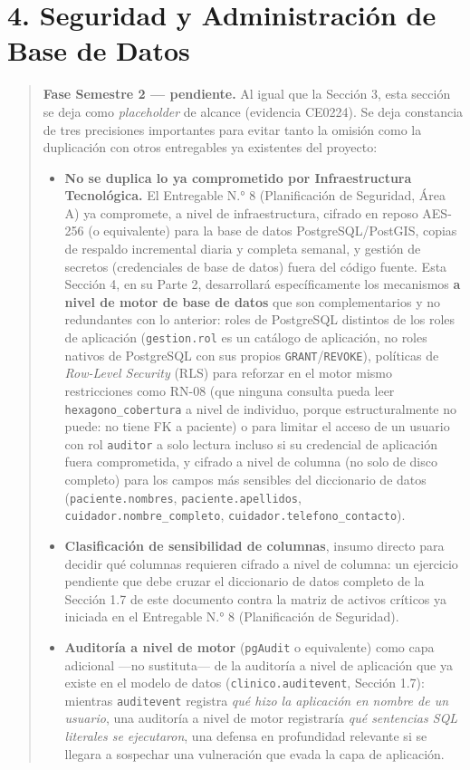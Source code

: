 \documentclass[11pt,a4paper]{article}
\providecommand{\tightlist}{%
  \setlength{\itemsep}{0pt}\setlength{\parskip}{0pt}}
\begin{document}
\section{4. Seguridad y Administración de Base de Datos}\label{seguridad-y-administraciuxf3n-de-base-de-datos}

\begin{quote}
\textbf{Fase Semestre 2 --- pendiente.} Al igual que la Sección 3, esta sección se deja como \emph{placeholder} de alcance (evidencia CE0224). Se deja constancia de tres precisiones importantes para evitar tanto la omisión como la duplicación con otros entregables ya existentes del proyecto:

\begin{itemize}
\tightlist
\item
  \textbf{No se duplica lo ya comprometido por Infraestructura Tecnológica.} El Entregable N.° 8 (Planificación de Seguridad, Área A) ya compromete, a nivel de infraestructura, cifrado en reposo AES-256 (o equivalente) para la base de datos PostgreSQL/PostGIS, copias de respaldo incremental diaria y completa semanal, y gestión de secretos (credenciales de base de datos) fuera del código fuente. Esta Sección 4, en su Parte 2, desarrollará específicamente los mecanismos \textbf{a nivel de motor de base de datos} que son complementarios y no redundantes con lo anterior: roles de PostgreSQL distintos de los roles de aplicación (\texttt{gestion.rol} es un catálogo de aplicación, no roles nativos de PostgreSQL con sus propios \texttt{GRANT}/\texttt{REVOKE}), políticas de \emph{Row-Level Security} (RLS) para reforzar en el motor mismo restricciones como RN-08 (que ninguna consulta pueda leer \texttt{hexagono\_cobertura} a nivel de individuo, porque estructuralmente no puede: no tiene FK a paciente) o para limitar el acceso de un usuario con rol \texttt{auditor} a solo lectura incluso si su credencial de aplicación fuera comprometida, y cifrado a nivel de columna (no solo de disco completo) para los campos más sensibles del diccionario de datos (\texttt{paciente.nombres}, \texttt{paciente.apellidos}, \texttt{cuidador.nombre\_completo}, \texttt{cuidador.telefono\_contacto}).
\item
  \textbf{Clasificación de sensibilidad de columnas}, insumo directo para decidir qué columnas requieren cifrado a nivel de columna: un ejercicio pendiente que debe cruzar el diccionario de datos completo de la Sección 1.7 de este documento contra la matriz de activos críticos ya iniciada en el Entregable N.° 8 (Planificación de Seguridad).
\item
  \textbf{Auditoría a nivel de motor} (\texttt{pgAudit} o equivalente) como capa adicional ---no sustituta--- de la auditoría a nivel de aplicación que ya existe en el modelo de datos (\texttt{clinico.auditevent}, Sección 1.7): mientras \texttt{auditevent} registra \emph{qué hizo la aplicación en nombre de un usuario}, una auditoría a nivel de motor registraría \emph{qué sentencias SQL literales se ejecutaron}, una defensa en profundidad relevante si se llegara a sospechar una vulneración que evada la capa de aplicación.
\end{itemize}
\end{quote}
\end{document}
